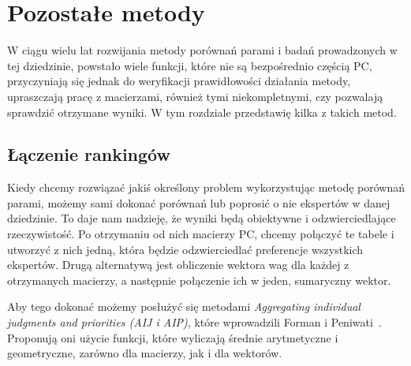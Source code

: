 \chapter{Pozostałe metody}
\label{sec:pozostałe}
W ciągu wielu lat rozwijania metody porównań parami i badań prowadzonych w tej dziedzinie, powstało wiele funkcji, które nie są bezpośrednio częścią PC, przyczyniają się jednak do weryfikacji prawidłowości działania metody, upraszczają pracę z macierzami, również tymi niekompletnymi, czy pozwalają sprawdzić otrzymane wyniki. W tym rozdziale przedstawię kilka z takich metod.
	
\section{Łączenie rankingów}
\label{subsec:aij}
Kiedy chcemy rozwiązać jakiś określony problem wykorzystując metodę porównań parami, możemy sami dokonać porównań lub poprosić o nie ekspertów w danej dziedzinie. To daje nam nadzieję, że wyniki będą obiektywne i odzwierciedlające rzeczywistość. Po otrzymaniu od nich macierzy PC, chcemy połączyć te tabele i utworzyć z nich jedną, która będzie odzwierciedlać preferencje wszystkich ekspertów. Drugą alternatywą jest obliczenie wektora wag dla każdej z otrzymanych macierzy, a następnie połączenie ich w jeden, sumaryczny wektor.

Aby tego dokonać możemy posłużyć się metodami \textit{Aggregating individual judgments and priorities (AIJ i AIP)}, które wprowadzili Forman i Peniwati~\cite{A13}. Proponują oni użycie funkcji, które wyliczają średnie arytmetyczne i geometryczne, zarówno dla macierzy, jak i dla wektorów. 

